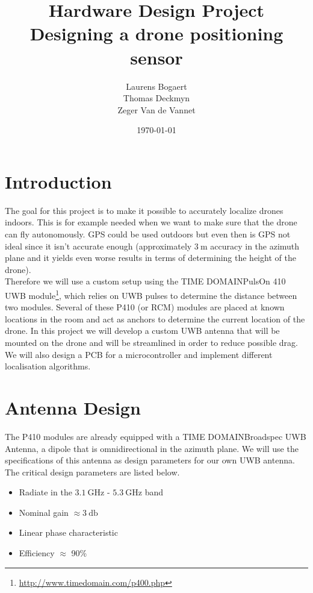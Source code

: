 \documentclass[a4paper]{article}        %
\title{Hardware Design Project\\ Designing a drone positioning sensor}
\author{Laurens Bogaert\\Thomas Deckmyn\\Zeger Van de Vannet}
\date{\today}
\begin{document}
\maketitle

\newpage
  \tableofcontents
\newpage

\section{Introduction}

The goal for this project is to make it possible to accurately localize drones indoors. This is for example needed when we want to make sure that the drone can fly autonomously. GPS could be used outdoors but even then is GPS not ideal since it isn't accurate enough (approximately $\SI{3}{\meter}$ accuracy in the azimuth plane and it yields even worse results in terms of determining the height of the drone). \\
Therefore we will use a custom setup using the TIME DOMAIN\texttrademark PulsOn 410 UWB module\footnote{\url{http://www.timedomain.com/p400.php}}, which relies on UWB pulses to determine the distance between two modules. Several of these P410 (or RCM) modules are placed at known locations in the room and act as anchors to determine the current location of the drone. In this project we will develop a custom UWB antenna that will be mounted on the drone and will be streamlined in order to reduce possible drag. We will also design a PCB for a microcontroller and implement different localisation algorithms.

\section{Antenna Design}
	
	 The P410 modules are already equipped with a TIME DOMAIN\texttrademark Broadspec UWB Antenna, a dipole that is omnidirectional in the azimuth plane. We will use the specifications of this antenna as design parameters for our own UWB antenna. The critical design parameters are listed below. 

	\begin{itemize}
		\item Radiate in the $\SI{3.1}{\giga\hertz}$ - $\SI{5.3}{\giga\hertz}$ band
		\item Nominal gain $\approx \SI{3}{\decibel}$
		\item Linear phase characteristic
		\item Efficiency $\approx$ 90\%	

	\end{itemize}
\end{document}
